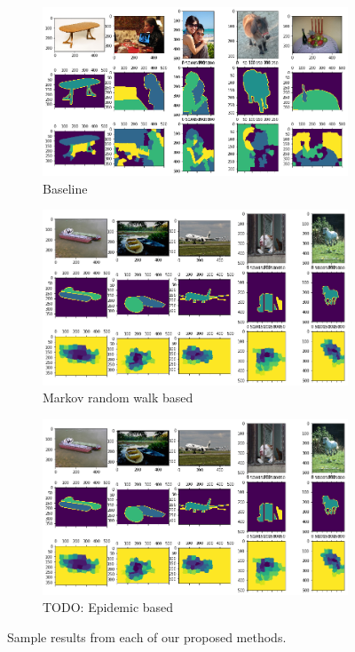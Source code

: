 \documentclass[twocolumn]{article}
\newcommand{\todo}[1]{}
\renewcommand{\todo}[1]{{\color{red} TODO: {#1}}}
\begin{document}
\begin{figure}[t!]
\centering

  \begin{subfigure}{\linewidth}
    \includegraphics[width=\linewidth]{figs/baseline_best.png}
    \caption{Baseline}
  \end{subfigure}

  \begin{subfigure}{\linewidth}
    \includegraphics[width=\linewidth]{figs/markov_best.png}
    \caption{Markov random walk based}
  \end{subfigure}

  \begin{subfigure}{\linewidth}
    \includegraphics[width=\linewidth]{figs/markov_best.png}
    \caption{\todo{Epidemic based}}
  \end{subfigure}

\caption{Sample results from each of our proposed methods.}
\end{figure}
\end{document}
